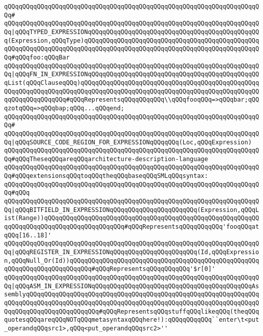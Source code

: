 \verb|qQQqqQQqqQQqqQQqqQQqqQQqqQQqqQQqqQQqqQQqqQQqqQQqqQQqqQQqqQQqqQQqqQQqqQQq#|\newline
\verb|qQQqqQQqqQQqqQQqqQQqqQQqqQQqqQQqqQQqqQQqqQQqqQQqqQQqqQQqqQQqqQQqqQQqqQQq|\verb#|qQQqTYPED_EXPRESSIONqQQqqQQqqQQqqQQqqQQqqQQqqQQqqQQqqQQqqQQqqQQqqQQq(Expression,qQQqType)qQQqqQQqqQQqqQQqqQQqqQQqqQQqqQQqqQQqqQQqqQQqqQQqqQQqqQQqqQQqqQQqqQQqqQQqqQQqqQQqqQQqqQQqqQQqqQQqqQQqqQQqqQQqqQQqqQQqqQQq#\verb|#qQQqfoo:qQQqBar|\newline
\verb|qQQqqQQqqQQqqQQqqQQqqQQqqQQqqQQqqQQqqQQqqQQqqQQqqQQqqQQqqQQqqQQqqQQqqQQq|\verb#|qQQqFN_IN_EXPRESSIONqQQqqQQqqQQqqQQqqQQqqQQqqQQqqQQqqQQqqQQqqQQqqQQqList(qQQqClauseqQQq)qQQqqQQqqQQqqQQqqQQqqQQqqQQqqQQqqQQqqQQqqQQqqQQqqQQqqQQqqQQqqQQqqQQqqQQqqQQqqQQqqQQqqQQqqQQqqQQqqQQqqQQqqQQqqQQqqQQqqQQqqQQqqQQqqQQqqQQq#\verb|#qQQqRepresentsqQQqqQQqqQQq\\qQQqfooqQQq=>qQQqbar;qQQqzotqQQq=>qQQqbap;qQQq...qQQqend;|\newline
\verb|qQQqqQQqqQQqqQQqqQQqqQQqqQQqqQQqqQQqqQQqqQQqqQQqqQQqqQQqqQQqqQQqqQQqqQQq#|\newline
\verb|qQQqqQQqqQQqqQQqqQQqqQQqqQQqqQQqqQQqqQQqqQQqqQQqqQQqqQQqqQQqqQQqqQQqqQQq|\verb#|qQQqSOURCE_CODE_REGION_FOR_EXPRESSIONqQQqqQQq(Loc,qQQqExpression)#\newline
\newline
\verb|qQQqqQQqqQQqqQQqqQQqqQQqqQQqqQQqqQQqqQQqqQQqqQQqqQQqqQQqqQQqqQQqqQQqqQQq#qQQqTheseqQQqareqQQqarchitecture-description-language|\newline
\verb|qQQqqQQqqQQqqQQqqQQqqQQqqQQqqQQqqQQqqQQqqQQqqQQqqQQqqQQqqQQqqQQqqQQqqQQq#qQQqextensionsqQQqtoqQQqtheqQQqbaseqQQqSMLqQQqsyntax:|\newline
\verb|qQQqqQQqqQQqqQQqqQQqqQQqqQQqqQQqqQQqqQQqqQQqqQQqqQQqqQQqqQQqqQQqqQQqqQQq#qQQq|\newline
\verb|qQQqqQQqqQQqqQQqqQQqqQQqqQQqqQQqqQQqqQQqqQQqqQQqqQQqqQQqqQQqqQQqqQQqqQQq|\verb#|qQQqBITFIELD_IN_EXPRESSIONqQQqqQQqqQQqqQQqqQQqqQQq(Expression,qQQqList(Range))qQQqqQQqqQQqqQQqqQQqqQQqqQQqqQQqqQQqqQQqqQQqqQQqqQQqqQQqqQQqqQQqqQQqqQQqqQQqqQQqqQQqqQQqqQQq#\verb|#qQQqRepresentsqQQqqQQqqQQq'fooqQQqatqQQq[16..18]'|\newline
\verb|qQQqqQQqqQQqqQQqqQQqqQQqqQQqqQQqqQQqqQQqqQQqqQQqqQQqqQQqqQQqqQQqqQQqqQQq|\verb#|qQQqREGISTER_IN_EXPRESSIONqQQqqQQqqQQqqQQqqQQqqQQq(Id,qQQqExpression,qQQqNull_Or(Id))qQQqqQQqqQQqqQQqqQQqqQQqqQQqqQQqqQQqqQQqqQQqqQQqqQQqqQQqqQQqqQQqqQQqqQQqqQQq#\verb|#qQQqRepresentsqQQqqQQqqQQq'$r[0]'|\newline
\verb|qQQqqQQqqQQqqQQqqQQqqQQqqQQqqQQqqQQqqQQqqQQqqQQqqQQqqQQqqQQqqQQqqQQqqQQq|\verb#|qQQqASM_IN_EXPRESSIONqQQqqQQqqQQqqQQqqQQqqQQqqQQqqQQqqQQqqQQqqQQqAssemblyqQQqqQQqqQQqqQQqqQQqqQQqqQQqqQQqqQQqqQQqqQQqqQQqqQQqqQQqqQQqqQQqqQQqqQQqqQQqqQQqqQQqqQQqqQQqqQQqqQQqqQQqqQQqqQQqqQQqqQQqqQQqqQQqqQQqqQQqqQQqqQQqqQQqqQQqqQQqqQQq#\verb|#qQQqRepresentsqQQqstuffqQQqlikeqQQq(theqQQqquotesqQQqareqQQqNOTqQQqmetasyntaxqQQqhere!):qQQqqQQqqQQq``enter\t<put_operandqQQqsrc1>,qQQq<put_operandqQQqsrc2>''|\newline
